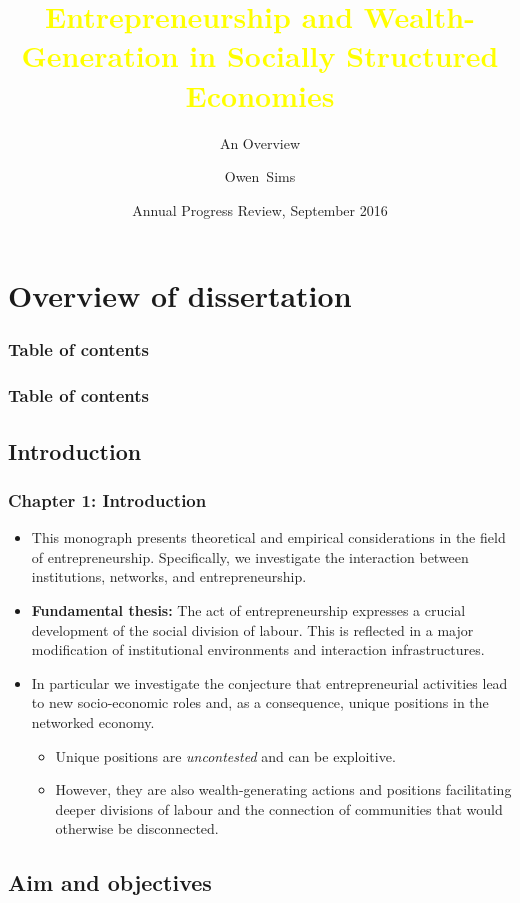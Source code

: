 \documentclass[9pt]{beamer}
\title[EntrepreneurshipSSE]{\textcolor{yellow}{Entrepreneurship and Wealth-Generation in Socially Structured Economies}}
\subtitle{An Overview}
\author[Sims]{Owen~Sims}
\institute[QUB]{Center for Data Science and Scalable Computing\\ Queen's University Belfast}
\date[APR 2016]{Annual Progress Review, September 2016}
\begin{document}
\begin{frame}
\titlepage
\end{frame}

\section{Overview of dissertation}

\begin{frame}
\frametitle{Table of contents}
\tableofcontents
\end{frame}

\begin{frame}
\frametitle{Table of contents}
\tableofcontents[currentsection]
\end{frame}

\subsection{Introduction}

\begin{frame} \frametitle{Chapter 1: Introduction}
\begin{itemize}
\item This monograph presents theoretical and empirical considerations in the field of entrepreneurship. Specifically, we investigate the interaction between institutions, networks, and entrepreneurship.
\medskip
\item \textbf{Fundamental thesis:} The act of entrepreneurship expresses a crucial development of the social division of labour. This is reflected in a major modification of institutional environments and interaction infrastructures.
\medskip
\item In particular we investigate the conjecture that entrepreneurial activities lead to new socio-economic roles and, as a consequence, unique positions in the networked economy.
\begin{itemize}
\medskip
\item Unique positions are \emph{uncontested} and can be exploitive.
\medskip
\item However, they are also wealth-generating actions and positions facilitating deeper divisions of labour and the connection of communities that would otherwise be disconnected.
\end{itemize}
\end{itemize}
\end{frame}

\subsection{Aim and objectives}
\end{document}
